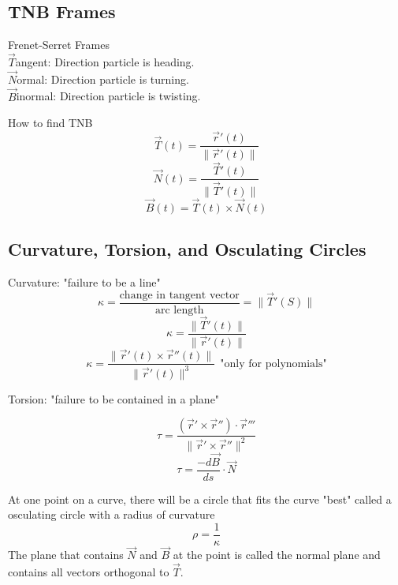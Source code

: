 \documentclass[12pt]{article}
\numberwithin{equation}{subsection}
\newcommand{\magp}[1]{\| #1 \|}
\begin{document}
\begin{flushleft}
\subsection{TNB Frames}
Frenet-Serret Frames\\
\bigskip
$\vec{T}$angent: Direction particle is heading.\\
$\vec{N}$ormal: Direction particle is turning.\\
$\vec{B}$inormal: Direction particle is twisting.\\
\bigskip

How to find TNB
\begin{equation}
\vec{T}(t)=\frac{\vec{r}'(t)}{\magp{\vec{r}'(t)}}
\end{equation}
\begin{equation}
\vec{N}(t)=\frac{\vec{T}'(t)}{\magp{\vec{T}'(t)}}
\end{equation}
\begin{equation}
\vec{B}(t)=\vec{T}(t) \times \vec{N}(t)
\end{equation}

\subsection{Curvature, Torsion, and Osculating Circles}
Curvature: "failure to be a line"
\begin{equation}
\kappa = \frac{\textrm{change in tangent vector}}{\textrm{arc length}}= \magp{\vec{T}'(S)}
\end{equation}
\begin{equation}
\kappa = \frac{\magp{\vec{T}'(t)}}{\magp{\vec{r}'(t)}}
\end{equation}
\begin{equation}
\kappa = \frac{\magp{\vec{r}'(t) \times \vec{r}''(t)}}{\magp{\vec{r}'(t)}^{3}} \ \ \textrm{"only for polynomials"}
\end{equation}

Torsion: "failure to be contained in a plane"

\begin{equation}
\tau = \frac{(\vec{r}' \times \vec{r}'') \cdot \vec{r}'''}{\magp{\vec{r}' \times \vec{r}''}^{2}}
\end{equation}
\begin{equation}
\tau =\frac{-d\vec{B}}{ds} \cdot \vec{N} 
\end{equation}

At one point on a curve, there will be a circle that fits the curve "best" called a osculating circle with a radius of curvature \begin{equation}\rho= \frac{1}{\kappa} \end{equation} The plane that contains $\vec{N}$ and $\vec{B}$ at the point is called the normal plane and contains all vectors orthogonal to $\vec{T}$.
\newpage


\end{flushleft}
\end{document}
